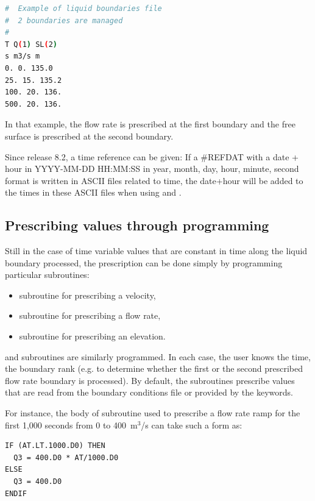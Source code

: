 \begin{lstlisting}[language=bash]
#  Example of liquid boundaries file
#  2 boundaries are managed
#
T Q(1) SL(2)
s m3/s m
0. 0. 135.0
25. 15. 135.2
100. 20. 136.
500. 20. 136.
\end{lstlisting}

In that example, the flow rate is prescribed at the first boundary and the free
surface is prescribed at the second boundary.

Since release 8.2, a time reference can be given:
If a \#REFDAT with a date + hour in YYYY-MM-DD HH:MM:SS
in year, month, day, hour, minute, second format is written in ASCII files
related to time,
the date+hour will be added to the times in these ASCII files
when using  and .

\subsection{Prescribing values through programming}

Still in the case of time variable values that are constant in time along the
liquid boundary processed, the prescription can be done simply by programming
particular subroutines:

\begin{itemize}
\item {} subroutine for prescribing a velocity,

\item {} subroutine for prescribing a flow rate,

\item {} subroutine for prescribing an elevation.
\end{itemize}

 and  subroutines are similarly programmed.
In each case, the user knows the time, the boundary rank (e.g. to determine
whether the first or the second prescribed flow rate boundary is processed).
By default, the subroutines prescribe values that are read from the boundary
conditions file or provided by the keywords.

For instance, the body of subroutine  used to prescribe a flow rate
ramp for the first 1,000 seconds from 0 to 400~m${}^{3}$/s can take such a form as:

\begin{lstlisting}[language=TelFortran]
IF (AT.LT.1000.D0) THEN
  Q3 = 400.D0 * AT/1000.D0
ELSE
  Q3 = 400.D0
ENDIF
\end{lstlisting}

